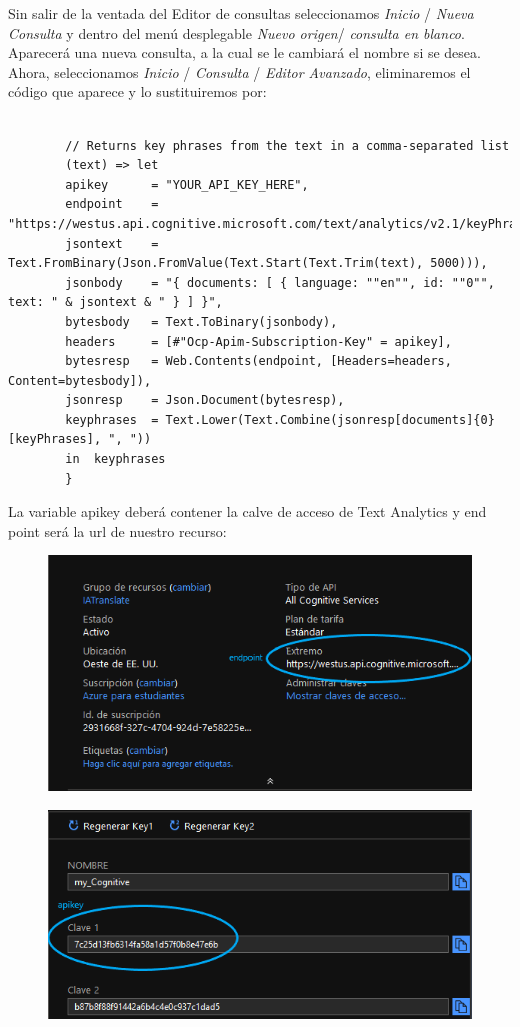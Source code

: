 \documentclass[runningheads]{llncs}
\begin{document}
	Sin salir de la ventada del Editor de consultas seleccionamos \textit{Inicio} / \textit{Nueva Consulta} y dentro del menú desplegable \textit{Nuevo origen}/ \textit{consulta en blanco}. Aparecerá una nueva consulta, a la cual se le cambiará el nombre si se desea.
	Ahora, seleccionamos \textit{Inicio} / \textit{Consulta} / \textit{Editor Avanzado}, eliminaremos el código que aparece y lo sustituiremos por:
	\small{
		\begin{verbatim}
		
		// Returns key phrases from the text in a comma-separated list
		(text) => let
		apikey      = "YOUR_API_KEY_HERE",
		endpoint    = "https://westus.api.cognitive.microsoft.com/text/analytics/v2.1/keyPhrases",
		jsontext    = Text.FromBinary(Json.FromValue(Text.Start(Text.Trim(text), 5000))),
		jsonbody    = "{ documents: [ { language: ""en"", id: ""0"", text: " & jsontext & " } ] }",
		bytesbody   = Text.ToBinary(jsonbody),
		headers     = [#"Ocp-Apim-Subscription-Key" = apikey],
		bytesresp   = Web.Contents(endpoint, [Headers=headers, Content=bytesbody]),
		jsonresp    = Json.Document(bytesresp),
		keyphrases  = Text.Lower(Text.Combine(jsonresp[documents]{0}[keyPhrases], ", "))
		in  keyphrases
		}
		\end{verbatim}
	}
	La variable apikey deberá contener la calve de acceso de Text Analytics y end point será la url de nuestro recurso: 
	\begin{figure}[H]
		\centering
		\includegraphics[scale=0.25]{./IA/AZURE/infoCog.png}
	\end{figure}
	\begin{figure}[H]
		\centering
		\includegraphics[scale=0.25]{./IA/AZURE/keyconf.png}
	\end{figure}
	
\end{document}
